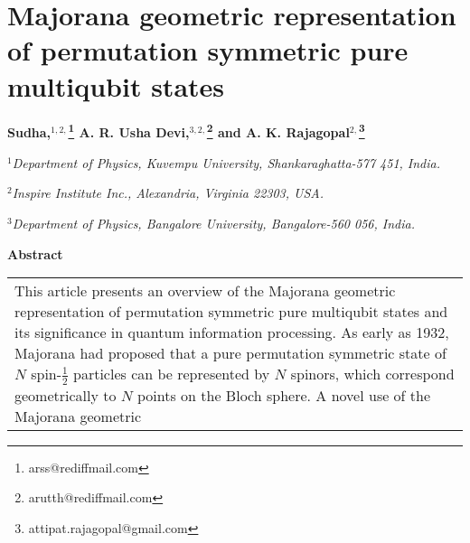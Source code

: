 \chapter{Majorana geometric representation of permutation symmetric pure multiqubit states} 


\renewcommand{\thefootnote}{\fnsymbol{footnote}}
\begin{center}
\textbf{Sudha,$^{1,2,}$\footnote{arss@rediffmail.com} A. R. Usha Devi,$^{3,2,}$\footnote{arutth@rediffmail.com} and A. K. Rajagopal$^{2,}$\footnote{attipat.rajagopal@gmail.com}}

\textit{$^{1}$Department of Physics, Kuvempu University, Shankaraghatta-577 451, India.}

\textit{$^{2}$Inspire Institute Inc., Alexandria, Virginia 22303, USA.}

\textit{$^{3}$Department of Physics, Bangalore University, Bangalore-560 056, India.} 
\end{center}

\vspace{-.4cm}

\begin{center}
\textbf{Abstract}
\end{center}

\vspace{-.5cm}

\begin{longtable}{p{8cm}}
{\parfillskip=0pt This article presents an overview of the Majorana geometric representation of permutation symmetric  pure multiqubit states and its significance in quantum information processing. As early as 1932, Majorana had proposed that a pure permutation symmetric state of $N$ spin-$\frac{1}{2}$ particles can be represented by $N$ spinors, which correspond geometrically to $N$ points on the Bloch sphere. A novel use of the Majorana geometric\par}\\
\end{longtable}

\newpage

